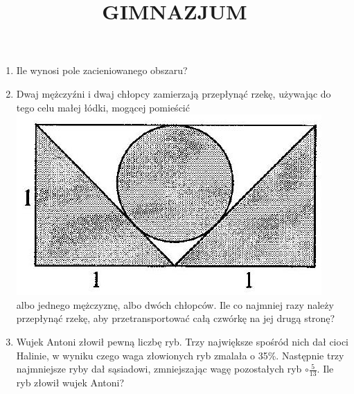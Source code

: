 \documentclass[10pt]{article}
\title{GIMNAZJUM }
\author{}
\date{}
\begin{document}
\maketitle
\begin{enumerate}
  \item Ile wynosi pole zacieniowanego obszaru?
  \item Dwaj mężczyźni i dwaj chłopcy zamierzają przepłynąć rzekę, używając do tego celu małej łódki, mogącej pomieścić\\
\includegraphics[max width=\textwidth, center]{2024_11_21_78948defe3ef45fddd28g-1(1)}\\
albo jednego mężczyznę, albo dwóch chłopców. Ile co najmniej razy należy przepłynąć rzekę, aby przetransportować całą czwórkę na jej drugą stronę?
  \item Wujek Antoni złowił pewną liczbę ryb. Trzy największe spośród nich dał cioci Halinie, w wyniku czego waga złowionych ryb zmalała o 35\%. Następnie trzy najmniejsze ryby dał sąsiadowi, zmniejszając wagę pozostałych ryb \(\circ \frac{5}{13}\). Ile ryb złowił wujek Antoni?
\end{enumerate}
\end{document}
